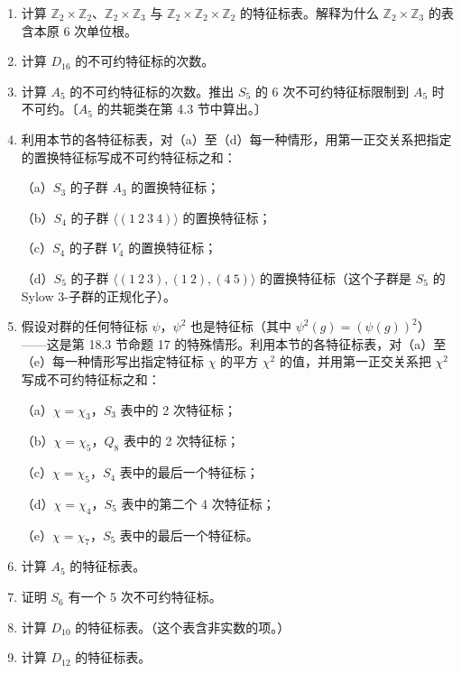 \begin{enumerate}
\item 计算 \(\mathbb{Z}_2 \times \mathbb{Z}_2\)、\(\mathbb{Z}_2 \times \mathbb{Z}_3\) 与 \(\mathbb{Z}_2 \times \mathbb{Z}_2 \times \mathbb{Z}_2\) 的特征标表。解释为什么 \(\mathbb{Z}_2 \times \mathbb{Z}_3\) 的表含本原 6 次单位根。

\item 计算 \(D_{16}\) 的不可约特征标的次数。

\item 计算 \(A_5\) 的不可约特征标的次数。推出 \(S_5\) 的 6 次不可约特征标限制到 \(A_5\) 时不可约。〔\(A_5\) 的共轭类在第 4.3 节中算出。〕

\item 利用本节的各特征标表，对（a）至（d）每一种情形，用第一正交关系把指定的置换特征标写成不可约特征标之和：

（a）\(S_3\) 的子群 \(A_3\) 的置换特征标；

（b）\(S_4\) 的子群 \(\langle(1\ 2\ 3\ 4)\rangle\) 的置换特征标；

（c）\(S_4\) 的子群 \(V_4\) 的置换特征标；

（d）\(S_5\) 的子群 \(\langle(1\ 2\ 3), (1\ 2), (4\ 5)\rangle\) 的置换特征标（这个子群是 \(S_5\) 的 Sylow 3-子群的正规化子）。

\item 假设对群的任何特征标 \(\psi\)，\(\psi^2\) 也是特征标（其中 \(\psi^2(g) = (\psi(g))^2\)）——这是第 18.3 节命题 17 的特殊情形。利用本节的各特征标表，对（a）至（e）每一种情形写出指定特征标 \(\chi\) 的平方 \(\chi^2\) 的值，并用第一正交关系把 \(\chi^2\) 写成不可约特征标之和：

（a）\(\chi = \chi_3\)，\(S_3\) 表中的 2 次特征标；

（b）\(\chi = \chi_5\)，\(Q_8\) 表中的 2 次特征标；

（c）\(\chi = \chi_5\)，\(S_4\) 表中的最后一个特征标；

（d）\(\chi = \chi_4\)，\(S_5\) 表中的第二个 4 次特征标；

（e）\(\chi = \chi_7\)，\(S_5\) 表中的最后一个特征标。

\item 计算 \(A_5\) 的特征标表。

\item 证明 \(S_6\) 有一个 5 次不可约特征标。

\item 计算 \(D_{10}\) 的特征标表。（这个表含非实数的项。）

\item 计算 \(D_{12}\) 的特征标表。


\end{enumerate}
